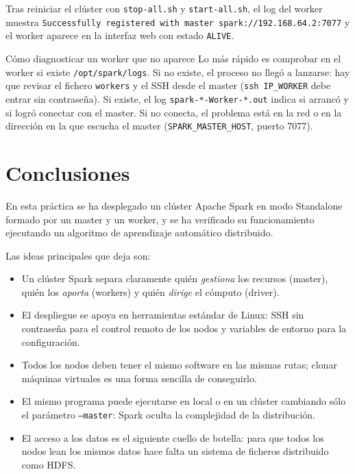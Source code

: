 \documentclass[11pt,a4paper]{article}
\begin{document}
Tras reiniciar el clúster con \texttt{stop-all.sh} y \texttt{start-all.sh}, el log del worker muestra \texttt{Successfully registered with master spark://192.168.64.2:7077} y el worker aparece en la interfaz web con estado \texttt{ALIVE}.

\begin{concepto}{Cómo diagnosticar un worker que no aparece}
Lo más rápido es comprobar en el worker si existe \texttt{/opt/spark/logs}. Si no existe, el proceso no llegó a lanzarse: hay que revisar el fichero \texttt{workers} y el SSH desde el master (\texttt{ssh IP\_WORKER} debe entrar sin contraseña). Si existe, el log \texttt{spark-*-Worker-*.out} indica si arrancó y si logró conectar con el master. Si no conecta, el problema está en la red o en la dirección en la que escucha el master (\texttt{SPARK\_MASTER\_HOST}, puerto 7077).
\end{concepto}

\section{Conclusiones}

En esta práctica se ha desplegado un clúster Apache Spark en modo Standalone formado por un master y un worker, y se ha verificado su funcionamiento ejecutando un algoritmo de aprendizaje automático distribuido.

Las ideas principales que deja son:
\begin{itemize}
  \item Un clúster Spark separa claramente quién \emph{gestiona} los recursos (master), quién los \emph{aporta} (workers) y quién \emph{dirige} el cómputo (driver).
  \item El despliegue se apoya en herramientas estándar de Linux: SSH sin contraseña para el control remoto de los nodos y variables de entorno para la configuración.
  \item Todos los nodos deben tener el mismo software en las mismas rutas; clonar máquinas virtuales es una forma sencilla de conseguirlo.
  \item El mismo programa puede ejecutarse en local o en un clúster cambiando sólo el parámetro \texttt{--master}: Spark oculta la complejidad de la distribución.
  \item El acceso a los datos es el siguiente cuello de botella: para que todos los nodos lean los mismos datos hace falta un sistema de ficheros distribuido como HDFS.
\end{itemize}
\end{document}
